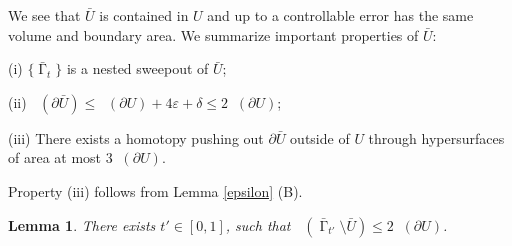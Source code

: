 \documentclass[12pt]{amsart}
\newtheorem{lemma}[theorem]{Lemma}
\DeclareMathOperator{\Hn}{\mathcal{H}^n}
\DeclareMathOperator{\G}{\Gamma}
\theoremstyle{definition}
\begin{document}
We see that $\bar{U}$ is contained in $U$
and up to a controllable error has the same volume and boundary area.
We summarize important properties of $\bar{U}$:

(i) $\{ \bar{\G}_t \}$ is a nested sweepout of
$\bar{U}$;

(ii) $\Hn(\partial \bar{U}) \leq \Hn(\partial U) + 4 \varepsilon + \delta \leq 2 \Hn(\partial U)$;

(iii) There exists a homotopy pushing out $\partial \bar{U}$
outside of $U$ through hypersurfaces of area at most $3 \Hn(\partial U)$.

Property (iii) follows from Lemma \ref*{epsilon} (B).


%
%

\begin{lemma} \label{long slice}
There exists $t' \in [0,1]$,
such that
$\Hn(\bar{\G}_{t'} \setminus \bar{U}) \leq 
2 \Hn( \partial U)$.
\end{lemma}
\end{document}
